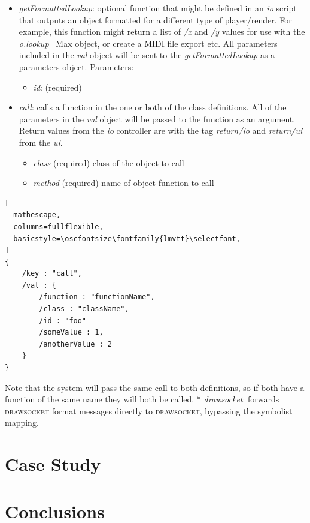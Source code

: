 \documentclass{article}
\def\drawsocket{\textsc{drawsocket}\xspace}
\def\oscfontsize{\footnotesize}
\begin{document}
\begin{itemize}
\item \textit{getFormattedLookup}: optional function that might be defined in an \textit{io} script that outputs an object formatted for a different type of player/render. For example, this function might return a list of \textit{/x} and \textit{/y} values for use with the \textit{o.lookup~} Max object, or create a MIDI file export etc. All parameters included in the \textit{val} object will be sent to the \textit{getFormattedLookup} as a parameters object. Parameters:

\begin{itemize}\itemsep0pt 
  \item \textit{id}: (required)
\end{itemize}
\item \textit{call}: calls a function in the one or both of the class definitions. All of the parameters in the \textit{val} object will be passed to the function as an argument. Return values from the \textit{io} controller are with the tag \textit{return/io} and \textit{return/ui} from the \textit{ui}.
\begin{itemize}\itemsep0pt 
  \item \textit{class} (required) class of the object to call
  \item \textit{method} (required) name of object function to call
\end{itemize}

\end{itemize}

\begin{lstlisting}[
  mathescape,
  columns=fullflexible,
  basicstyle=\oscfontsize\fontfamily{lmvtt}\selectfont,
]
{
    /key : "call",
    /val : {
        /function : "functionName",
        /class : "className",
        /id : "foo"
        /someValue : 1,
        /anotherValue : 2
    }
}
\end{lstlisting}

Note that the system will pass the same call to both definitions, so if both have a function of the same name they will both be called.
* \textit{drawsocket}: forwards \drawsocket format messages directly to \drawsocket, bypassing the symbolist mapping.




\section{Case Study}\label{sec:james_score}



\section{Conclusions}


\begin{acknowledgments}

\end{acknowledgments} 

\balance %

\end{document}
